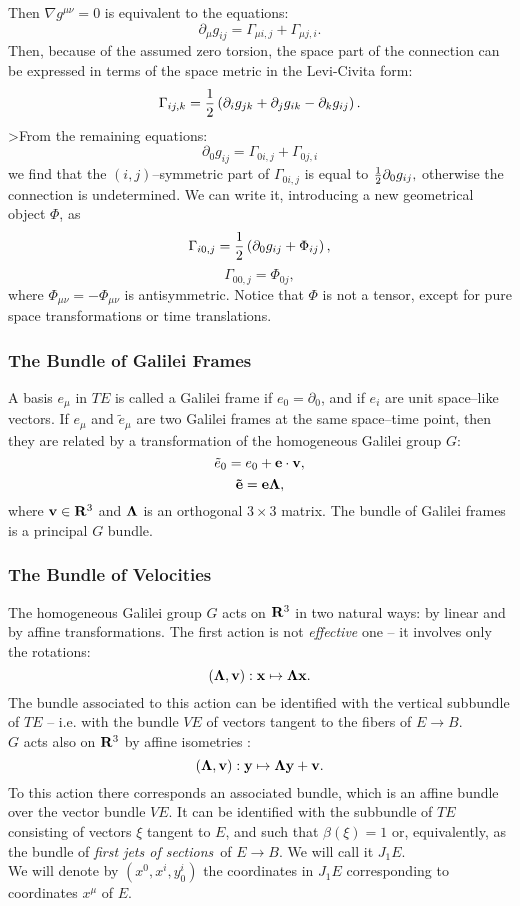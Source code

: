 \documentclass[12pt]{article}
\def\be{\begin{equation}} \def\ee{\end{equation}}
\begin{document}
Then $\nabla g^{\mu\nu}=0$ is equivalent to the equations: 
\be
\partial_\mu g_{ij}=\Gamma_{\mu i, j}+\Gamma_{\mu j, i} . 
\ee
Then,  because of the assumed zero torsion,  the space part of the
connection can be expressed in terms of the space metric in
the Levi-Civita form:
\be
\Gamma_{ij, k}={1\over2}\left ( \partial_i g_{jk}+
\partial_j g_{ik}-
\partial_k g_{ij}\right) . 
\ee
>From the remaining equations:
\be
\partial_0 g_{ij}= \Gamma_{0i, j} + \Gamma_{0j, i} 
\ee
we find that the  $(i,j)$--symmetric part of $\Gamma_{0i, j}$ is equal to
${1\over2}\partial_0 g_{ij} , $ otherwise the connection is
undetermined.  We can write it, introducing a new
geometrical object $\Phi$, as
\be
\Gamma_{i0, j}={1\over2}\left (\partial_0 g_{ij}+\Phi_{ij}\right) , 
\ee
\be
\Gamma_{00, j}=\Phi_{0j} , 
\ee
where $\Phi_{\mu\nu}=-\Phi_{\mu\nu}$ is antisymmetric. Notice
that $\Phi$ is not a tensor, except for pure space transformations
or time translations.
\subsubsection{The Bundle of Galilei Frames}
A basis $e_{\mu}$ in $TE$ is called a Galilei frame if
$e_0=\partial_0$,  and if $e_i$ are unit space--like vectors.  If
$e_\mu$ and $\tilde{e}_\mu$ are two Galilei frames at the same
space--time point,  then they are related by a transformation of the homogeneous
Galilei group $G$: 
\be
\tilde{e}_0=e_0+{\bf e\cdot v} , 
\ee
\be
{\bf \tilde{e}}={\bf e}{\bf\Lambda} , 
\ee
where ${\bf v}\in {\bf R}^3$ and ${\bf \Lambda}$ is an orthogonal
$3\times 3$ matrix. 
The bundle of Galilei frames is a principal $G$ bundle. 
\subsubsection{The Bundle of Velocities }
The homogeneous Galilei group $G$ acts on ${\bf R}^3$ in two
natural ways:  by linear and by affine transformations.  The first
action is not {\sl effective} one -- it involves only the rotations:
\be
 ({\bf \Lambda}, {\bf v}): {\bf x}\mapsto {\bf\Lambda x}. 
\ee
The bundle associated to this action can be identified with the
vertical subbundle of $TE$ -- i.e.  with the bundle $VE$ of vectors
tangent to the fibers of $E\rightarrow B$. \\
$G$ acts also on ${\bf R}^3$ by affine
isometries : 
\be
 ({\bf \Lambda}, {\bf v}): {\bf y}\mapsto {\bf\Lambda y}+{\bf v}  . 
\ee
To this action there corresponds an associated bundle,  which is an
affine bundle over the vector bundle $VE$. 
 It can be identified with the subbundle of $TE$ consisting of
vectors $\xi$ tangent to $E$, and such that $\beta  (\xi )=1$ or,
equivalently,  as the bundle of {\sl first jets of sections}\, of
$E\rightarrow B$.  We will call it  $J_1E$. \\
We will denote by $ (x^0, x^{i}, y_0^{i})$ the coordinates in $J_1E$
corresponding to coordinates $x^{\mu}$  of $E$.  
\end{document}
